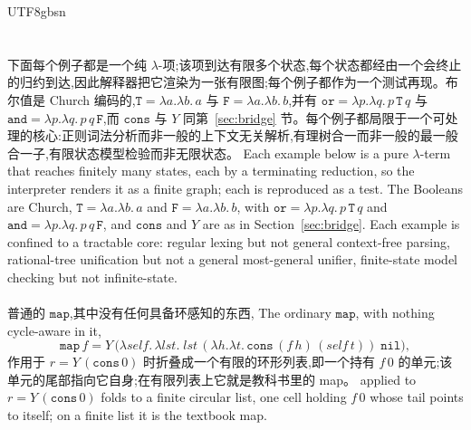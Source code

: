 \begin{CJK*}{UTF8}{gbsn}
  

  \section{}\label{app:dsl}
  \ifTablambdaChinese
  下面每个例子都是一个纯 $\lambda$-项;该项到达有限多个状态,每个状态都经由一个会终止的归约到达,因此解释器把它渲染为一张有限图;每个例子都作为一个测试再现。布尔值是 Church 编码的,$\mathtt{T} = \lambda a.\lambda b.\,a$ 与 $\mathtt{F} = \lambda a.\lambda b.\,b$,并有 $\mathtt{or} = \lambda p.\lambda q.\,p\,\mathtt{T}\,q$ 与 $\mathtt{and} = \lambda p.\lambda q.\,p\,q\,\mathtt{F}$,而 $\mathtt{cons}$ 与 $Y$ 同第~\ref{sec:bridge} 节。每个例子都局限于一个可处理的核心:正则词法分析而非一般的上下文无关解析,有理树合一而非一般的最一般合一子,有限状态模型检验而非无限状态。
  \else
  Each example below is a pure $\lambda$-term that reaches finitely many states, each by a terminating reduction, so the interpreter renders it as a finite graph; each is reproduced as a test. The Booleans are Church, $\mathtt{T} = \lambda a.\lambda b.\,a$ and $\mathtt{F} = \lambda a.\lambda b.\,b$, with $\mathtt{or} = \lambda p.\lambda q.\,p\,\mathtt{T}\,q$ and $\mathtt{and} = \lambda p.\lambda q.\,p\,q\,\mathtt{F}$, and $\mathtt{cons}$ and $Y$ are as in Section~\ref{sec:bridge}. Each example is confined to a tractable core: regular lexing but not general context-free parsing, rational-tree unification but not a general most-general unifier, finite-state model checking but not infinite-state.
  \fi

  \paragraph{}
  \ifTablambdaChinese 普通的 $\mathtt{map}$,其中没有任何具备环感知的东西, \else The ordinary $\mathtt{map}$, with nothing cycle-aware in it, \fi
  \[
    \mathtt{map}\,f = Y\,\big(\lambda\mathit{self}.\,\lambda\mathit{lst}.\;
    \mathit{lst}\,(\lambda h.\lambda t.\,\mathtt{cons}\,(f\,h)\,(\mathit{self}\,t))\;\mathtt{nil}\big),
  \]
  \ifTablambdaChinese 作用于 $r = Y\,(\mathtt{cons}\,0)$ 时折叠成一个有限的环形列表,即一个持有 $f\,0$ 的单元;该单元的尾部指向它自身;在有限列表上它就是教科书里的 map。 \else applied to $r = Y\,(\mathtt{cons}\,0)$ folds to a finite circular list, one cell holding $f\,0$ whose tail points to itself; on a finite list it is the textbook map. \fi


\end{CJK*}
